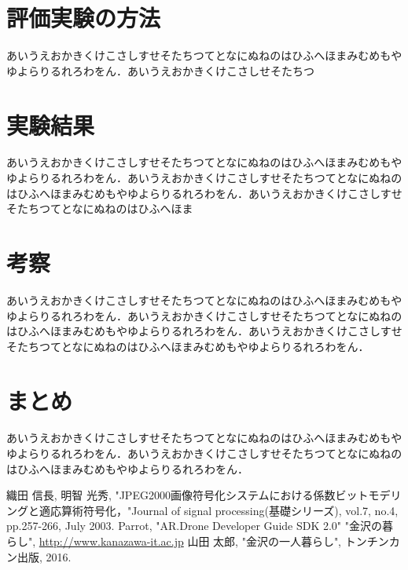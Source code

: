 \begin{multicols*}{2}
	\section{評価実験の方法}
	あいうえおかきくけこさしすせそたちつてとなにぬねのはひふへほまみむめもやゆよらりるれろわをん．あいうえおかきくけこさしせそたちつ

	
		\section{実験結果}
	あいうえおかきくけこさしすせそたちつてとなにぬねのはひふへほまみむめもやゆよらりるれろわをん．あいうえおかきくけこさしすせそたちつてとなにぬねのはひふへほまみむめもやゆよらりるれろわをん．あいうえおかきくけこさしすせそたちつてとなにぬねのはひふへほま	
	\section{考察}
		あいうえおかきくけこさしすせそたちつてとなにぬねのはひふへほまみむめもやゆよらりるれろわをん．あいうえおかきくけこさしすせそたちつてとなにぬねのはひふへほまみむめもやゆよらりるれろわをん．あいうえおかきくけこさしすせそたちつてとなにぬねのはひふへほまみむめもやゆよらりるれろわをん．
	\section{まとめ}
		あいうえおかきくけこさしすせそたちつてとなにぬねのはひふへほまみむめもやゆよらりるれろわをん．あいうえおかきくけこさしすせそたちつてとなにぬねのはひふへほまみむめもやゆよらりるれろわをん．


\begin{thebibliography}{99}
 織田 信長, 明智 光秀, "JPEG2000画像符号化システムにおける係数ビットモデリングと適応算術符号化，"Journal of signal processing(基礎シリーズ), vol.7, no.4, pp.257-266, July 2003.
Parrot, "AR.Drone Developer Guide SDK 2.0"
 "金沢の暮らし", \url{http://www.kanazawa-it.ac.jp}
 山田 太郎, "金沢の一人暮らし", トンチンカン出版, 2016.
\end{thebibliography}

\end{multicols*} 


